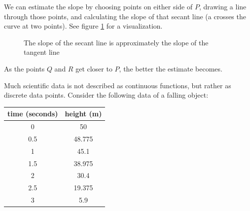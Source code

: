 We can estimate the slope by choosing points on either side of $P$, drawing a 
line through those points, and calculating the slope of that secant line (a
 crosses the curve at two points). See figure 
\ref{fig:secant} for a visualization. 

\begin{figure}[H]
    \centering
    \caption{The slope of the secant line is approximately the slope of the 
    tangent line}
    \label{fig:secant}
\end{figure}

As the points $Q$ and $R$ get closer to $P$, the better the estimate becomes. 

Much scientific data is not described as continuous functions, but rather as 
discrete data points. Consider the following data of a falling object:
\begin{center}
\begin{tabular}{|c|c|}
\hline
time (seconds) & height (m)\\\hline
0 & 50\\\hline
0.5 & 48.775\\\hline
1 & 45.1\\\hline
1.5 & 38.975\\\hline
2 & 30.4\\\hline
2.5 & 19.375\\\hline
3 & 5.9 \\\hline
\end{tabular}
\end{center}

